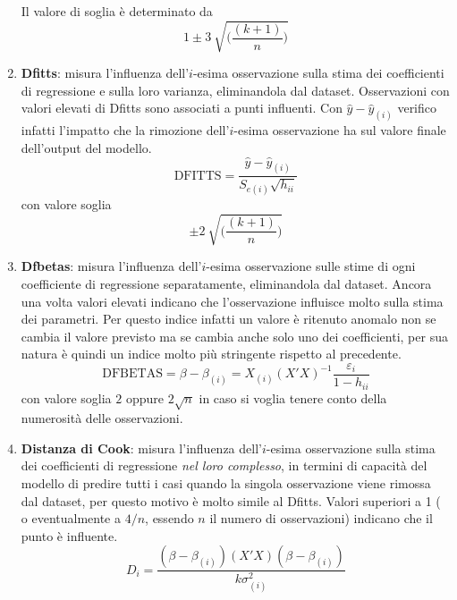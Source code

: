\documentclass[a4page, 11pt]{article} %
\begin{document}
\begin{enumerate}
\begin{equation*}
\end{equation*}
Il valore di soglia è determinato da
\begin{equation*}
1\pm 3 \  \sqrt{\biggl(\frac{(k+1)}{n}\biggr)}
\end{equation*}
\item \textbf{Dfitts}: misura l’influenza dell'$i$-esima osservazione sulla stima dei coefficienti di regressione e sulla loro varianza, eliminandola dal dataset. Osservazioni con valori elevati di Dfitts sono associati a punti influenti. Con $\hat{y} - \hat{y}_{(i)}$ verifico infatti l'impatto che la rimozione dell'$i$-esima osservazione ha sul valore finale dell'output del modello.
\begin{equation*}
\mathrm{DFITTS} = \frac{\hat{y} - \hat{y}_{(i)}}{S_{e(i)}\sqrt{h_{ii}}}
\end{equation*}
con valore soglia
\begin{equation*}
\pm 2 \ \sqrt{\biggl(\frac{(k+1)}{n}\biggr)}
\end{equation*}
\item \textbf{Dfbetas}: misura l’influenza dell'$i$-esima osservazione sulle stime di ogni coefficiente di regressione separatamente, eliminandola dal dataset. Ancora una volta valori elevati indicano che l'osservazione influisce molto sulla stima dei parametri. Per questo indice infatti un valore è ritenuto anomalo non se cambia il valore previsto ma se cambia anche solo uno dei coefficienti, per sua natura è quindi un indice molto più stringente rispetto al precedente.
\begin{equation*}
\mathrm{DFBETAS} = \beta - \beta_{(i)} = X_{(i)}(X'X)^{-1}\frac{\varepsilon_i}{1-h_{ii}}
\end{equation*}
con valore soglia $2$ oppure $2\sqrt{n}$ in caso si voglia tenere conto della numerosità delle osservazioni.
\item \textbf{Distanza di Cook}: misura l’influenza dell'$i$-esima osservazione sulla stima dei coefficienti di regressione \textit{nel loro complesso}, in termini di capacità del modello di predire tutti i casi quando la singola osservazione viene rimossa dal dataset, per questo motivo è molto simile al Dfitts. Valori superiori a 1 ( o eventualmente a $4/n$, essendo $n$ il numero di osservazioni) indicano che il punto è influente.
\begin{equation*}
D_i = \frac{(\beta - \beta_{(i)})(X'X)(\beta - \beta_{(i)})}{k\sigma_{(i)}^2}
\end{equation*}
\end{enumerate}
\end{document}
